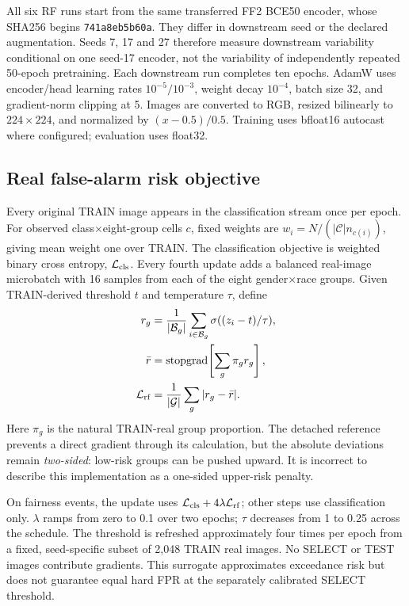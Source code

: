 \documentclass[10pt,twocolumn,letterpaper]{article}
\newcommand{\sg}{\operatorname{stopgrad}}
\begin{document}
All six RF runs start from the same transferred FF2 BCE50 encoder, whose SHA256 begins
\texttt{741a8eb5b60a}. They differ in downstream seed or the declared augmentation.
Seeds 7, 17 and 27 therefore measure downstream variability conditional on one seed-17 encoder,
not the variability of independently repeated 50-epoch pretraining.
Each downstream run completes ten epochs. AdamW uses encoder/head learning rates $10^{-5}/10^{-3}$,
weight decay $10^{-4}$, batch size 32, and gradient-norm clipping at 5.
Images are converted to RGB, resized bilinearly to $224\times224$, and normalized by $(x-0.5)/0.5$.
Training uses bfloat16 autocast where configured; evaluation uses float32.

\subsection{Real false-alarm risk objective}
Every original TRAIN image appears in the classification stream once per epoch.
For observed class$\times$eight-group cells $c$, fixed weights are
$w_i=N/(|\mathcal C|n_{c(i)})$, giving mean weight one over TRAIN.
The classification objective is weighted binary cross entropy, $\mathcal L_{\rm cls}$.
Every fourth update adds a balanced real-image microbatch with 16 samples from each of the eight
gender$\times$race groups. Given TRAIN-derived threshold $t$ and temperature $\tau$, define
\begin{align}
 r_g &= \frac{1}{|\mathcal B_g|}\sum_{i\in\mathcal B_g}\sigma((z_i-t)/\tau),\\
 \bar r &= \sg\!\left[\sum_g\pi_g r_g\right],\\
 \mathcal L_{\rm rf} &= \frac{1}{|\mathcal G|}\sum_g|r_g-\bar r|.
 \label{eq:risk}
\end{align}
Here $\pi_g$ is the natural TRAIN-real group proportion. The detached reference prevents a direct gradient
through its calculation, but the absolute deviations remain \emph{two-sided}: low-risk groups can be pushed
upward. It is incorrect to describe this implementation as a one-sided upper-risk penalty.

On fairness events, the update uses
$\mathcal L_{\rm cls}+4\lambda\mathcal L_{\rm rf}$; other steps use classification only.
$\lambda$ ramps from zero to 0.1 over two epochs; $\tau$ decreases from 1 to 0.25 across the schedule.
The threshold is refreshed approximately four times per epoch from a fixed, seed-specific subset of 2,048
TRAIN real images. No SELECT or TEST images contribute gradients.
This surrogate approximates exceedance risk but does not guarantee equal hard FPR at the separately
calibrated SELECT threshold.
\end{document}

